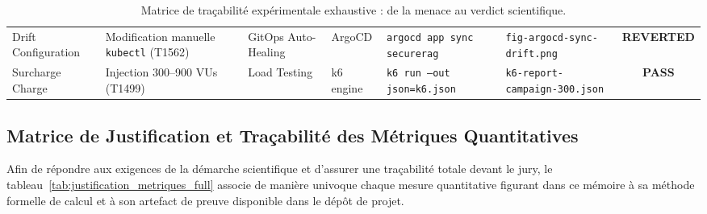 \begin{table}[H]
{\begin{tabular}{@{}p{2.2cm}p{2.6cm}p{2.8cm}p{2.0cm}p{3.2cm}p{3.2cm}c@{}}
Drift Configuration & Modification manuelle \texttt{kubectl} (T1562) & GitOps Auto-Healing & ArgoCD & \texttt{argocd app sync securerag} & \texttt{fig-argocd-sync-drift.png} & \textbf{REVERTED} \\
Surcharge Charge & Injection 300--900 VUs (T1499) & Load Testing & k6 engine & \texttt{k6 run --out json=k6.json} & \texttt{k6-report-campaign-300.json} & \textbf{PASS} \\
\bottomrule
\end{tabular}
}
\caption{Matrice de traçabilité expérimentale exhaustive : de la menace au verdict scientifique.}
\label{tab:matrice_tracabilite_experimentale_full}
\end{table}


\subsection{Matrice de Justification et Traçabilité des Métriques Quantitatives}

Afin de répondre aux exigences de la démarche scientifique et d'assurer une traçabilité totale devant le jury, le tableau~\ref{tab:justification_metriques_full} associe de manière univoque chaque mesure quantitative figurant dans ce mémoire à sa méthode formelle de calcul et à son artefact de preuve disponible dans le dépôt de projet.


